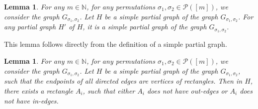 \documentclass[10pt,a4paper]{amsart}
\numberwithin{equation}{section}
\theoremstyle{plain}
\newtheorem{lemma}[theorem]{Lemma}
\def\bN{\mathbb N}
\def\cP{\mathcal P}
\begin{document}
\begin{lemma} \label{Lem-simple-subgraph}
For any $m \in \bN$, for any permutations $\sigma_1,\sigma_2 \in \cP([m])$, we consider the graph $G_{\sigma_1,\sigma_2}$. Let $H$ be a simple partial graph of the graph $G_{\sigma_1,\sigma_2}$. For any partial graph $H'$ of $H$, it is a simple partial graph of the graph $G_{\sigma_1,\sigma_2}$.
\end{lemma}

This lemma follows directly from the definition of a simple partial graph.

\begin{lemma} \label{Lem-simple}
For any $m \in \bN$, for any permutations $\sigma_1,\sigma_2 \in \cP([m])$, we consider the graph $G_{\sigma_1,\sigma_2}$. Let $H$ be a simple partial graph of the graph $G_{\sigma_1,\sigma_2}$, such that the endpoints of all directed edges are vertices of rectangles. Then in $H$, there exists a rectangle $A_i$, such that either $A_i$ does not have out-edges or $A_i$ does not have in-edges.
\end{lemma}
\end{document}
